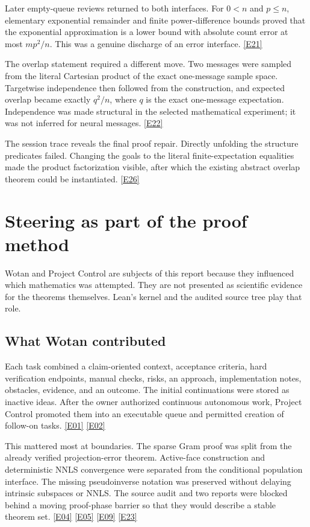 \documentclass[11pt,a4paper]{article}
\newcommand{\ev}[1]{%
  \hyperref[ev:#1]{\textcolor{ReportBlue}{\textsf{\scriptsize[#1]}}}}
\begin{document}
Later empty-queue reviews returned to both interfaces. For \(0<n\) and \(p\leq n\),
elementary exponential remainder and finite power-difference bounds proved that the
exponential approximation is a lower bound with absolute count error at most
\(mp^2/n\). This was a genuine discharge of an error interface. \ev{E21}

The overlap statement required a different move. Two messages were sampled from the
literal Cartesian product of the exact one-message sample space. Targetwise
independence then followed from the construction, and expected overlap became exactly
\(q^2/n\), where \(q\) is the exact one-message expectation. Independence was made
structural in the selected mathematical experiment; it was not inferred for neural
messages. \ev{E22}

The session trace reveals the final proof repair. Directly unfolding the structure
predicates failed. Changing the goals to the literal finite-expectation equalities
made the product factorization visible, after which the existing abstract overlap
theorem could be instantiated. \ev{E26}

\section{Steering as part of the proof method}
\label{sec:steering}

Wotan and Project Control are subjects of this report because they influenced which
mathematics was attempted. They are not presented as scientific evidence for the
theorems themselves. Lean's kernel and the audited source tree play that role.

\subsection{What Wotan contributed}

Each task combined a claim-oriented context, acceptance criteria, hard verification
endpoints, manual checks, risks, an approach, implementation notes, obstacles,
evidence, and an outcome. The initial continuations were stored as inactive ideas.
After the owner authorized continuous autonomous work, Project Control promoted them
into an executable queue and permitted creation of follow-on tasks. \ev{E01}\ev{E02}

This mattered most at boundaries. The sparse Gram proof was split from the already
verified projection-error theorem. Active-face construction and deterministic NNLS
convergence were separated from the conditional population interface. The missing
pseudoinverse notation was preserved without delaying intrinsic subspaces or NNLS.
The source audit and two reports were blocked behind a moving proof-phase barrier so
that they would describe a stable theorem set. \ev{E04}\ev{E05}\ev{E09}\ev{E23}
\end{document}
